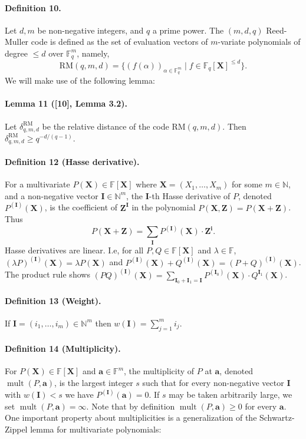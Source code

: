 \documentclass[10pt,a4paper]{article}
\begin{document}
\paragraph{Definition 10.} Let $d,m$ be non-negative integers, and $q$ a prime power. The $(m,d,q)$ Reed-Muller code is defined as the set of evaluation vectors of $m$-variate polynomials of degree $\leq d$ over $\mathbb F_q^m$, namely,
\[\mathrm{RM}(q,m,d)=\{(f(\alpha))_{\alpha\in\mathbb F_q^m}\mid f\in\mathbb F_q[\boldsymbol X]^{\leq d}\}.\]
We will make use of the following lemma:
\paragraph{Lemma 11 ([10], Lemma 3.2).} Let $\delta_{q,m,d}^{\mathrm{RM}}$ be the relative distance of the code $\mathrm{RM}(q,m,d)$. Then $\delta_{q,m,d}^{\mathrm{RM}}\geq q^{-d/(q-1)}$.
\paragraph{Definition 12 (Hasse derivative).} For a multivariate $P(\boldsymbol X)\in\mathbb F[\boldsymbol X]$ where $\boldsymbol X=(X_1,\ldots,X_m)$ for some $m\in\mathbb N$, and a non-negative vector $\boldsymbol I\in\mathbb N^m$, the $\boldsymbol I$-th Hasse derivative of $P$, denoted $P^{(\boldsymbol I)}(\boldsymbol X)$, is the coefficient of $\boldsymbol Z^{\boldsymbol I}$ in the polynomial $P(\boldsymbol X,\boldsymbol Z)=P(\boldsymbol X+\boldsymbol Z)$. Thus
\[P(\boldsymbol X+\boldsymbol Z)=\sum_{\boldsymbol I}P^{(\boldsymbol I)}(\boldsymbol X)\cdot\boldsymbol Z^{\boldsymbol i}.\]
Hasse derivatives are linear. I.e, for all $P,Q\in\mathbb F[\boldsymbol X]$ and $\lambda\in\mathbb F$, $(\lambda P)^{(\boldsymbol I)}(\boldsymbol X)=\lambda P(\boldsymbol X)$ and $P^{(\boldsymbol I)}(\boldsymbol X)+Q^{(\boldsymbol I)}(\boldsymbol X)=(P+Q)^{(\boldsymbol I)}(\boldsymbol X)$. The product rule shows $(PQ)^{(\boldsymbol I)}(\boldsymbol X)=\sum_{\boldsymbol I_0+\boldsymbol I_1=\boldsymbol I}P^{(\boldsymbol I_0)}(\boldsymbol X)\cdot Q^{\boldsymbol I_1}(\boldsymbol X)$.
\paragraph{Definition 13 (Weight).} If $\boldsymbol I=(i_1,\ldots,i_m)\in\mathbb N^m$ then $w(\boldsymbol I)=\sum_{j=1}^mi_j$.
\paragraph{Definition 14 (Multiplicity).} For $P(\boldsymbol X)\in\mathbb F[\boldsymbol X]$ and $\boldsymbol a\in\mathbb F^m$, the multiplicity of $P$ at $\boldsymbol a$, denoted $\operatorname{mult}(P,\boldsymbol a)$, is the largest integer $s$ such that for every non-negative vector $\boldsymbol I$ with $w(\boldsymbol I)<s$ we have $P^{(\boldsymbol I)}(\boldsymbol a)=0$. If $s$ may be taken arbitrarily large, we set $\operatorname{mult}(P,\boldsymbol a)=\infty$.
Note that by definition $\operatorname{mult}(P,\boldsymbol a)\geq0$ for every $\boldsymbol a$. One important property about multiplicities is a generalization of the Schwartz-Zippel lemma for multivariate polynomials:
\end{document}
